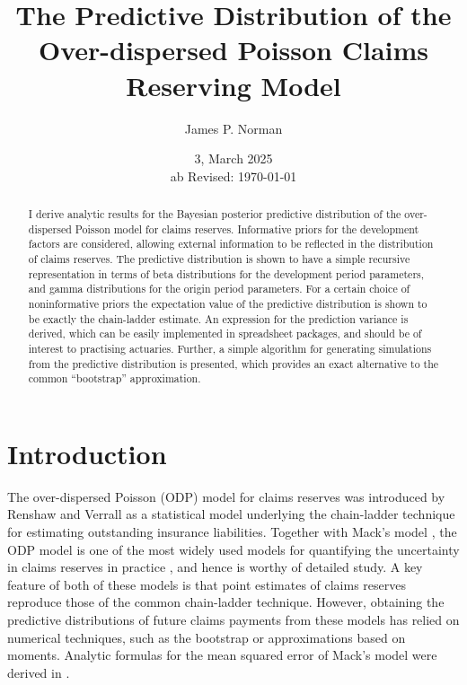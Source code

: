 \documentclass[aps,pre,draft]{revtex4-2}
\begin{document}
\title{The Predictive Distribution of the Over-dispersed Poisson Claims Reserving Model}
\author{James P. Norman}
\date{3, March 2025 \\ ab Revised:
\today}


\begin{abstract}
I derive analytic results for the Bayesian posterior predictive distribution of the over-dispersed Poisson model for claims reserves. Informative priors for the development factors are considered, allowing external information to be reflected in the distribution of claims reserves. The predictive distribution is shown to have a simple recursive representation in terms of beta distributions for the development period parameters, and gamma distributions for the origin period parameters. For a certain choice of noninformative priors the expectation value of the predictive distribution is shown to be exactly the chain-ladder estimate. An expression for the prediction variance is derived, which can be easily implemented in spreadsheet packages, and should be of interest to practising actuaries. Further, a simple algorithm for generating simulations from the predictive distribution is presented, which provides an exact alternative to the common ``bootstrap'' approximation.
\end{abstract}

\maketitle
\section{Introduction}

The over-dispersed Poisson (ODP) model for claims reserves was introduced by Renshaw and Verrall \cite{renshaw1998stochastic} as a statistical model underlying the chain-ladder technique for estimating outstanding insurance liabilities. Together with Mack’s model \cite{mack1993distribution}, the ODP model is one of the most widely used models for quantifying the uncertainty in claims reserves in practice \cite{roc2007best}, and hence is worthy of detailed study. A key feature of both of these models is that point estimates of claims reserves reproduce those of the common chain-ladder technique. However, obtaining the predictive distributions of future claims payments from these models has relied on numerical techniques, such as the bootstrap or approximations based on moments. Analytic formulas for the mean squared error of Mack’s model were derived in \cite{mack1993distribution}.
\end{document}
